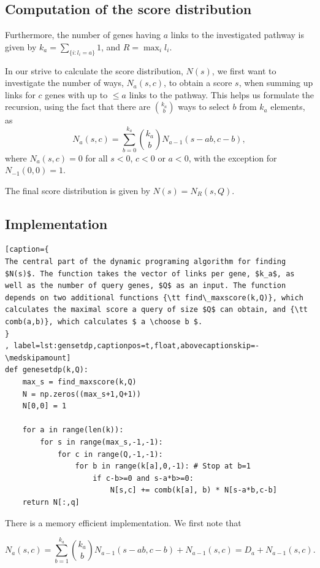 \documentclass[a4paper,american]{lipics-v2016}
\begin{document}
\subsection*{Computation of the score distribution}

Furthermore, the number of genes having $a$ links to the investigated pathway is given by $k_a=\sum_{\{i:l_i=a\}}1$, and $R=\max_{i}{l_i}$.

In our strive to calculate the score distribution, $N(s)$, we first want to investigate the number of ways, $N_a(s,c)$, to obtain a score $s$, when summing up links for $c$ genes with up to $\le a$ links to the pathway. This helps us formulate the recursion, using the fact that there are $k_a \choose b$ ways to select $b$ from $k_a$ elements, as
\begin{equation}
N_a(s,c)=\sum_{b=0}^{k_a}{k_a \choose b} N_{a-1}(s-ab,c-b),
\end{equation}
where $N_a(s,c)=0$ for all $s<0$, $c<0$ or $a<0$, with the exception for $N_{-1}(0,0)=1$.

The final score distribution is given by $N(s)=N_R(s,Q)$.

\subsection*{Implementation}

\begin{lstlisting}[caption={
The central part of the dynamic programing algorithm for finding $N(s)$. The function takes the vector of links per gene, $k_a$, as well as the number of query genes, $Q$ as an input. The function depends on two additional functions {\tt find\_maxscore(k,Q)}, which calculates the maximal score a query of size $Q$ can obtain, and {\tt comb(a,b)}, which calculates $ a \choose b $.
}
, label=lst:gensetdp,captionpos=t,float,abovecaptionskip=-\medskipamount]
def genesetdp(k,Q):
    max_s = find_maxscore(k,Q)
    N = np.zeros((max_s+1,Q+1))
    N[0,0] = 1

    for a in range(len(k)):
        for s in range(max_s,-1,-1):
            for c in range(Q,-1,-1):
                for b in range(k[a],0,-1): # Stop at b=1
                    if c-b>=0 and s-a*b>=0:
                        N[s,c] += comb(k[a], b) * N[s-a*b,c-b]
    return N[:,q]
\end{lstlisting}
There is a memory efficient implementation. We first note that

\[
N_a(s,c)=\sum_{b=1}^{k_a}{k_a \choose b} N_{a-1}(s-ab,c-b) + N_{a-1}(s,c)=D_a+N_{a-1}(s,c).
\]
\end{document}
